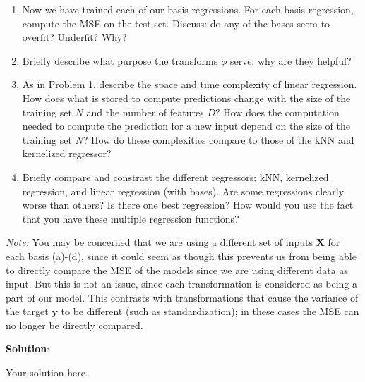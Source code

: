 \documentclass[submit]{../harvardml}
\newenvironment{solution}{
    \vspace{2mm}
    \color{blue}\noindent\textbf{Solution}:
}{}
\begin{document}
\begin{problem}
\begin{enumerate}
        Then, create a plot of the fitted regression line for each basis against a scatter plot of the training data. Boilerplate plotting code is provided in the notebook---you will only need to finish up a part of it. \textbf{All you need to include in your writeup for this part are these four plots.}
    
        \item Now we have trained each of our basis regressions. For each basis regression, compute the MSE on the test set. Discuss: do any of the bases seem to overfit? Underfit? Why?
    
        \item Briefly describe what purpose the transforms $\phi$ serve: why are they helpful?
    
        \item As in Problem 1, describe the space and time complexity of linear regression.  How does what is stored to compute predictions change with the size of the training set $N$ and the number of features $D$?  How does the computation needed to compute the prediction for a new input depend on the size of the training set $N$?  How do these complexities compare to those of the kNN and kernelized regressor?
    
        \item Briefly compare and constrast the different regressors: kNN, kernelized regression, and linear regression (with bases). Are some regressions clearly worse than others?  Is there one best regression?  How would you use the fact that you have these multiple regression functions?
    \end{enumerate}
      
    \noindent \textit{Note:} You may be concerned that we are using a different set of inputs $\mathbf{X}$ for each basis (a)-(d), since it could seem as though this prevents us from being able to directly compare the MSE of the models since we are using different data as input. But this is not an issue, since each transformation is considered as being a part of our model. This contrasts with transformations that cause the variance of the target $\mathbf{y}$ to be different  (such as standardization); in these cases the MSE can no longer be directly compared.
\end{problem}

\newpage

\begin{solution}
	Your solution here.
\end{solution}
\end{document}
